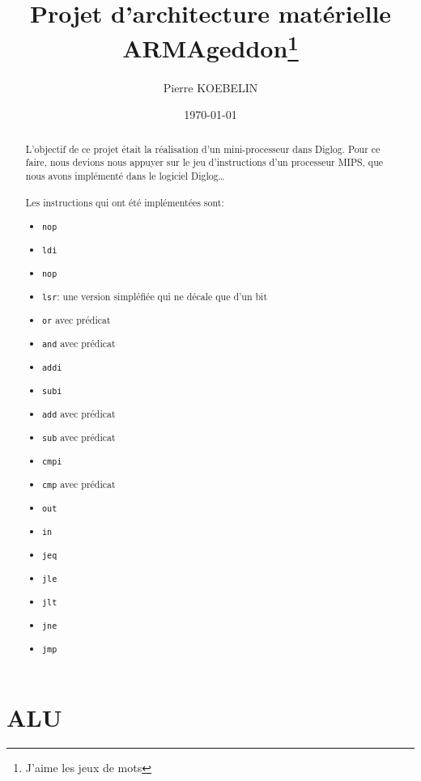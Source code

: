 \documentclass[11pt, a4paper, twoside, titlepage]{article}
\begin{document}
\title{{\titlefont Projet d'architecture matérielle}\\ARMAgeddon\thanks{J'aime les jeux de mots}}
\author{Pierre KOEBELIN}
\date{\today}
\maketitle

\begin{abstract}
L’objectif de ce projet était la réalisation d’un mini-processeur dans Diglog. Pour ce faire, nous devions nous appuyer sur le jeu d'instructions d'un processeur MIPS, que nous avons implémenté dans le logiciel Diglog\ldots\\
\\
Les instructions qui ont été implémentées sont:
\begin{itemize}
        \item{\texttt{nop}}
        \item{\texttt{ldi}}
        \item{\texttt{nop}}
        \item{\texttt{lsr}: une version simpléfiée qui ne décale que d'un bit}
        \item{\texttt{or} avec prédicat}
        \item{\texttt{and} avec prédicat}
        \item{\texttt{addi}}
        \item{\texttt{subi}}
        \item{\texttt{add} avec prédicat}
        \item{\texttt{sub} avec prédicat}
        \item{\texttt{cmpi}}
        \item{\texttt{cmp} avec prédicat}
        \item{\texttt{out}}
        \item{\texttt{in}}
        \item{\texttt{jeq}}
        \item{\texttt{jle}}
        \item{\texttt{jlt}}
        \item{\texttt{jne}}
        \item{\texttt{jmp}}
\end{itemize}
\end{abstract}

\tableofcontents

\newpage
\section{ALU}
\end{document}
